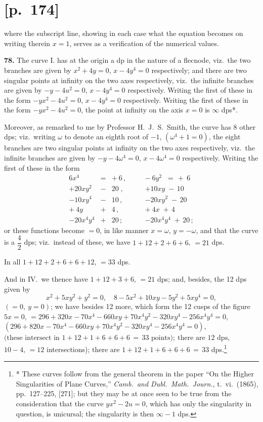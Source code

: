 \documentclass[11pt]{article}
\begin{document}
\section*{[p.~174]}
where the subscript line, showing in each case what the equation becomes on writing
therein $x=1$, serves as a verification of the numerical values.

\medskip
\noindent\textbf{78.} The curve I. has at the origin a dp in the nature of a flecnode, viz.\
the two branches are given by $x^2+4y=0$, $x-4y^4=0$ respectively; and there are
two singular points at infinity on the two axes respectively, viz.\ the infinite branches
are given by $-y-4u^2=0$, $x-4y^4=0$ respectively. Writing the first of these in the
form $-yx^2-4u^2=0$, $x-4y^4=0$ respectively. Writing the first of these in the
form $-yx^2-4u^2=0$, the point at infinity on the axis $x=0$ is $\infty$ dps*.

Moreover, as remarked to me by Professor H.~J.~S.~Smith, the curve has 8 other
dps; viz.\ writing $\omega$ to denote an eighth root of $-1$, $(\omega^4+1=0)$, the eight branches are
two singular points at infinity on the two axes respectively, viz.\ the infinite branches
are given by $-y-4\omega^4=0$, $x-4\omega^4=0$ respectively. Writing the first of these in the
form
\[
\begin{array}{rcrcl}
6x^4 &=& +\ 6 \,, &\quad& -\ 6y^2 \;\;=\,+\ 6 \\
+20xy^2 &-& 20 \;,& & +10xy \;-\, 10 \\
-10xy^4 &-& 10 \,,& & -20xy^2 \;-\, 20 \\
+\ 4y &+& 4 \,,& & +\ 4x \;+\, 4 \\
-20x^4y^4&+&20 \,;& & -20x^4y^4\;+\,20\,;
\end{array}
\]
or these functions become $=0$, in like manner $x=\omega$, $y=-\omega$, and that the curve is a $\dfrac{4}{2}$ dps;
viz.\ instead of these, we have $1\!+\!12\!+\!2\!+\!6+6$, $=21$ dps.

In all $1\!+\!12\!+\!2\!+\!6+6+12$, $=33$ dps.

And in IV.\ we thence have $1\!+\!12\!+\!3\!+\!6$, $=21$ dps; and, besides, the 12 dps
given by
\[
x^2+5xy^2+y^2=0,\quad 8-5x^2+10xy-5y^2+5xy^4=0,
\]
$(=0,\ y=0)$; we have besides 12 more, which form the 12 cusps of the figure $5x=0$,
$=296+320x-70x^4-660xy+70x^4y^2-320xy^4-256x^4y^4=0$,
$(296+820x-70x^4-660xy+70x^4y^2-320xy^4-256x^4y^4=0)$,
\hfill$\big(\text{these intersect in } 1\!+\!12\!+\!1\!+\!6\!+\!6\!+\!6\,=\,33\text{ points});\ \text{there are 12 dps},$
$10-4,\,=12$ intersections); there are $1\!+\!12\!+\!1\!+\!6\!+\!6\!+\!6\,=\,33$ dps.\footnote{* These curves follow from the general theorem in the paper ``On the Higher Singularities of Plane
Curves,'' \textit{Camb.\ and Dubl.\ Math.\ Journ.}, t.~vi.\ (1865), pp.~127--225, [271]; but they may be at once seen to
be true from the consideration that the curve $yx^2-2u=0$, which has only the singularity in question, is
unicursal; the singularity is then $\infty-1$ dps.}
\end{document}
